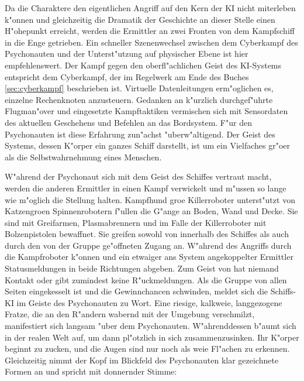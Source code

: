 Da die Charaktere den eigentlichen Angriff auf den Kern der KI nicht miterleben k"onnen und gleichzeitig die Dramatik der Geschichte an dieser Stelle einen H"ohepunkt erreicht, werden die Ermittler an zwei Fronten von dem Kampfschiff in die Enge getrieben. Ein schneller Szenenwechsel zwischen dem Cyberkampf des Psychonauten und der Unterst"utzung auf physischer Ebene ist hier empfehlenswert. Der Kampf gegen den oberfl"achlichen Geist des KI-Systems entspricht dem Cyberkampf, der im Regelwerk am Ende des Buches  \cref{sec:cyberkampf} beschrieben ist. Virtuelle Datenleitungen erm"oglichen es, einzelne Rechenknoten anzusteuern. Gedanken an k"urzlich durchgef"uhrte Flugman"over und eingesetzte Kampftaktiken vermischen sich mit Sensordaten des aktuellen Geschehens und Befehlen an das Bordsystem. F"ur den Psychonauten ist diese Erfahrung zun"achst "uberw"altigend. Der Geist des Systems, dessen K"orper ein ganzes Schiff darstellt, ist um ein Vielfaches gr"o\3er als die Selbstwahrnehmung eines Menschen.

W"ahrend der Psychonaut sich mit dem Geist des Schiffes vertraut macht, werden die anderen Ermittler in einen Kampf verwickelt und m"ussen so lange wie m"oglich die Stellung halten. Kampfhund gro\3e Killerroboter unterst"utzt von Katzengro\3en Spinnenrobotern f"ullen die G"ange an Boden, Wand und Decke. Sie sind mit Greifarmen, Plasmabrennern und im Falle der Killerroboter mit Bolzenpistolen bewaffnet. Sie greifen sowohl von innerhalb des Schiffes als auch durch den von der Gruppe ge"offneten Zugang an. W"ahrend des Angriffs durch die Kampfroboter k"onnen \ml{} und ein etwaiger ans System angekoppelter Ermittler Statusmeldungen in beide Richtungen abgeben. Zum Geist von \xl{} hat niemand Kontakt oder \ml{} gibt zumindest keine R"uckmeldungen. Als die Gruppe von allen Seiten eingekesselt ist und die Gewinnchancen schwinden, meldet sich die Schiffs-KI im Geiste des Psychonauten zu Wort. Eine riesige, kalkwei\3e, langgezogene Fratze, die an den R"andern wabernd mit der Umgebung verschmilzt, manifestiert sich langsam "uber dem Psychonauten. W"ahrenddessen b"aumt sich \xl{} in der realen Welt auf, um dann pl"otzlich in sich zusammenzusinken. Ihr K"orper beginnt zu zucken, und die Augen sind nur noch als wei\3e Fl"achen zu erkennen. Gleichzeitig nimmt der Kopf im Blickfeld des Psychonauten klar gezeichnete Formen an und spricht mit donnernder Stimme:


